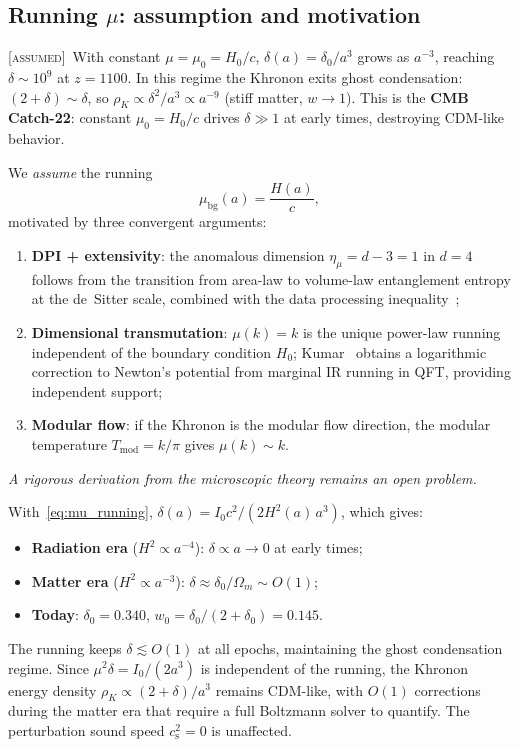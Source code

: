 \documentclass[prd,twocolumn,superscriptaddress,longbibliography,floatfix]{revtex4-2}
\newcommand{\cs}{c_{\mathrm{s}}}
\newcommand{\assumed}{\textsc{[assumed]}}
\begin{document}
\subsection{Running $\mu$: assumption and motivation}
\label{sec:running_mu}

\assumed\  With constant $\mu = \mu_0 = H_0/c$,
$\delta(a) = \delta_0/a^3$ grows as $a^{-3}$, reaching
$\delta \sim 10^9$ at $z = 1100$.  In this regime
the Khronon exits ghost condensation:
$(2{+}\delta) \sim \delta$, so
$\rho_K \propto \delta^2/a^3 \propto a^{-9}$
(stiff matter, $w \to 1$).  This is the
\textbf{CMB Catch-22}: constant $\mu_0 = H_0/c$ drives
$\delta \gg 1$ at early times, destroying CDM-like behavior.

We \emph{assume} the running
\begin{equation}
\mu_{\mathrm{bg}}(a) = \frac{H(a)}{c},
\label{eq:mu_running}
\end{equation}
motivated by three convergent arguments:
\begin{enumerate}
\item \textbf{DPI + extensivity}: the anomalous dimension
  $\eta_\mu = d - 3 = 1$ in $d = 4$ follows from the transition
  from area-law to volume-law entanglement entropy at the
  de~Sitter scale, combined with the data processing
  inequality~\cite{Verlinde2016,Jacobson2016,CasiniHuerta2017,DorauMuch2025};
\item \textbf{Dimensional transmutation}: $\mu(k) = k$ is the
  unique power-law running independent of the boundary condition
  $H_0$; Kumar~\cite{Kumar2025} obtains a logarithmic correction
  to Newton's potential from marginal IR running in QFT,
  providing independent support;
\item \textbf{Modular flow}: if the Khronon is the modular flow
  direction, the modular temperature $T_{\mathrm{mod}} = k/\pi$
  gives $\mu(k) \sim k$.
\end{enumerate}
\emph{A rigorous derivation from the microscopic theory remains
an open problem.}

With~\eqref{eq:mu_running},
$\delta(a) = I_0 c^2/(2H^2(a)\,a^3)$, which gives:
\begin{itemize}
\item \textbf{Radiation era} ($H^2 \propto a^{-4}$):
  $\delta \propto a \to 0$ at early times;
\item \textbf{Matter era} ($H^2 \propto a^{-3}$):
  $\delta \approx \delta_0/\Omega_m \sim O(1)$;
\item \textbf{Today}: $\delta_0 = 0.340$,
  $w_0 = \delta_0/(2{+}\delta_0) = 0.145$.
\end{itemize}
The running keeps $\delta \lesssim O(1)$ at all epochs,
maintaining the ghost condensation regime.  Since
$\mu^2\delta = I_0/(2a^3)$ is independent of the running,
the Khronon energy density $\rho_K \propto (2{+}\delta)/a^3$
remains CDM-like, with $O(1)$ corrections during the
matter era that require a full Boltzmann solver to quantify.
The perturbation sound speed $\cs^2 = 0$ is unaffected.
\end{document}
